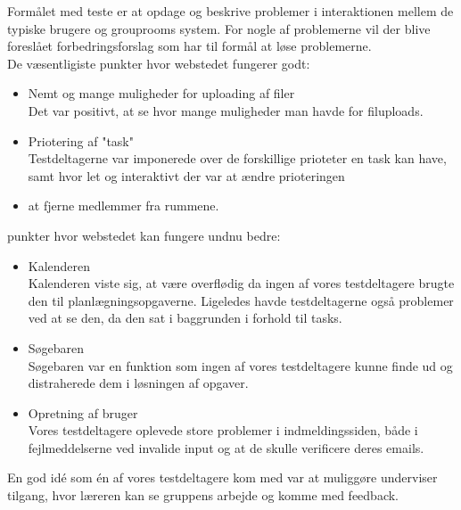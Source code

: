 \documentclass[12pt]{article}
\begin{document}
\noindent Formålet med teste er at opdage og beskrive problemer i interaktionen mellem de typiske brugere og grouprooms system. For nogle af problemerne vil der blive foreslået forbedringsforslag som har til formål at løse problemerne.\\

De væsentligiste punkter hvor webstedet fungerer godt:\\
\begin{itemize}
  \item Nemt og mange muligheder for uploading af filer\\
        Det var positivt, at se hvor mange muligheder man havde for filuploads.
  \item Priotering af "task"\\
        Testdeltagerne var imponerede over de forskillige prioteter en task kan have, samt  hvor let og interaktivt der var at ændre prioteringen
  \item at fjerne medlemmer fra rummene.
\end{itemize}
punkter hvor webstedet kan fungere undnu bedre:
\begin{itemize}
  \item Kalenderen \\
        Kalenderen viste sig, at være overflødig da ingen af vores testdeltagere brugte den til planlægningsopgaverne. Ligeledes havde testdeltagerne også problemer ved at se den, da den sat i baggrunden i forhold til tasks.
  \item Søgebaren \\
        Søgebaren var en funktion som ingen af vores testdeltagere kunne finde ud og distraherede dem i løsningen af opgaver.
  \item Opretning af bruger\\
        Vores testdeltagere oplevede store problemer i indmeldingssiden, både i fejlmeddelserne ved invalide input og at de skulle verificere deres emails.
\end{itemize}

\noindent En god idé som én af vores testdeltagere kom med var at muliggøre underviser tilgang, hvor læreren kan se gruppens arbejde og komme med feedback.\\
\newpage

\tableofcontents %

\thispagestyle{empty}

\newpage
\pagestyle{plain}
\setcounter{page}{1}
\end{document}
